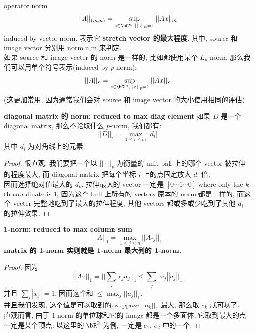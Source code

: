 \documentclass[lang=cn,11pt]{elegantbook}
\begin{document}
\begin{example}
\begin{definition}{operator norm}
 $$
||A||_{(m,n)} = \sup _{z\in \bC^m, ||z||_n = 1  } ||Ax||_m
$$
induced by vector norm. 表示它\textbf{ stretch vector 的最大程度}. 其中, source 和 image vector 分别用 norm n,m 来判定.\\
如果 source 和 image vector 的 norm 是一样的, 比如都使用某个 $L_p$ norm, 那么我们可以用单个符号表示(induced by $p$-norm):$$ ||A||_{p} = \sup _{z\in \bC^m, ||z||_p= 1  } ||Ax||_p
$$
(这更加常用, 因为通常我们会对 source 和 image vector 的大小使用相同的评估)
\end{definition}

\begin{proposition}{\textbf{diagonal matrix 的 norm: reduced to max diag element}}
    如果 $D$ 是一个 diagonal matrix, 那么不论取什么 $p$-norm, 我们都有: $$
    ||D||_p = \max_{1 \leq i \leq m} |d_i|
    $$
    其中 $d_i$ 为对角线上的元素.
\end{proposition}
\begin{proof}
很直观. 我们要把一个以 $||\cdot||_p$ 为衡量的 unit ball 上的哪个 vector 被拉伸的程度最大,  而 diagonal matrix 把每个坐标 $i$ 上的点固定放大 $d_i$ 倍, \\
因而选择绝对值最大的 $d_k$, 拉伸最大的 vector 一定是 $[0\cdots1\cdots0]$ where only the $k$-th coordinate is $1$, 因为这个 ball 上所有的 vectors 原本的 norm 都是一样的, 而这个 vector 完整地吃到了最大的拉伸程度, 其他 vectors 都或多或少吃到了其他 $d_i$ 的拉伸效果.
\end{proof}

\begin{proposition}{\textbf{1-norm: reduced to max column sum}}
\begin{equation}
    ||A||_1 =  \max_{1 \leq j \leq n}  ||A_{*j}||_1
\end{equation}
\textbf{matrix 的 1-norm 实则就是 1-norm 最大列的 1-norm.}
\end{proposition}
\begin{proof}
    因为 
    $$
    ||Ax||_1 = || \sum_i x_j a_j ||_1 \leq \sum_j |x_j| |a_j||_1
    $$
    并且 $\sum_j |x_j| = 1$, 因而这个和 $\leq \max_j ||a_j||_1$.\\
    并且我们发现, 这个值是可以取到的: suppose $||a_k||_1$ 最大, 那么取 $e_k$ 就可以了.\\
直观而言, 由于 1-norm 的单位球和它的 image 都是一个多面体, 它取到最大的点一定是某个顶点. 以这里的 $\bR^2$ 为例, 一定是 $e_1$, $e_2$ 中的一个.
\end{proof}


\end{example}
\end{document}
